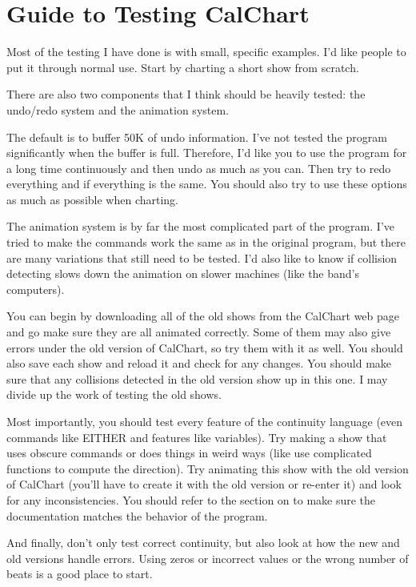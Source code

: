 \chapter{Guide to Testing CalChart}\label{testing}

Most of the testing I have done is with small, specific examples.  I'd
like people to put it through normal use.  Start by charting a short
show from scratch.

There are also two components that I think should be heavily tested: the
undo/redo system and the animation system.

The default is to buffer 50K of undo information.  I've not tested the
program significantly when the buffer is full.  Therefore, I'd like you
to use the program for a long time continuously and then undo as much as you
can.  Then try to redo everything and if everything is the same.  You
should also try to use these options as much as possible when charting.

The animation system is by far the most complicated part of the
program.  I've tried to make the commands work the same as in the
original program, but there are many variations that still need to be
tested.  I'd also like to know if collision detecting slows down the
animation on slower machines (like the band's computers).

You can begin by downloading all of the old shows from the CalChart web
page and go make sure they are all animated correctly.  Some of them may
also give errors under the old version of CalChart, so try them with it
as well.  You should also save each show and reload it and check for any
changes.  You should make sure that any collisions detected in the old
version show up in this one.  I may divide up the work of testing the
old shows.

Most importantly, you should test every feature of the continuity language
(even commands like EITHER and features like variables).  Try making a
show that uses obscure commands or does things in weird ways (like use
complicated functions to compute the direction).  Try animating this
show with the old version of CalChart (you'll have to create it with the
old version or re-enter it) and look for any inconsistencies.  You
should refer to the section on 
to make sure the documentation matches the behavior of the program.

And finally, don't only test correct continuity, but also look at how
the new and old versions handle errors.  Using zeros or incorrect values
or the wrong number of beats is a good place to start.

